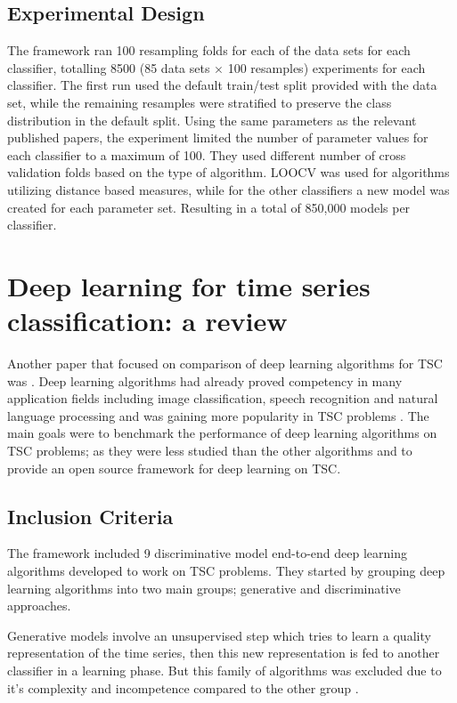 \subsection{Experimental Design}
\label{subsectionUniBakeoffExperiment}
The framework ran 100 resampling folds for each of the data sets for each classifier, totalling 8500 (85 data sets $\times$ 100 resamples) experiments for each classifier.
The first run used the default train/test split provided with the data set, while the remaining resamples were stratified to preserve the class distribution in the default split.
Using the same parameters as the relevant published papers, the experiment limited the number of parameter values for each classifier to a maximum of 100.
They used different number of cross validation folds based on the type of algorithm. LOOCV was used for algorithms utilizing distance based measures,
while for the other classifiers a new model was created for each parameter set. Resulting in a total of 850,000 models per classifier.

\section{Deep learning for time series classification: a review}
\label{DeepLearningReview}
Another paper that focused on comparison of deep learning algorithms for TSC was \cite{fawaz2019deepreview}.
Deep learning algorithms had already proved competency in many application fields including image classification, speech recognition and natural language processing \cite{he2016deep,santos2016literature,krizhevsky2012imagenet,guan2019towards}
and was gaining more popularity in TSC problems \cite{zheng2014time,zheng2016exploiting,zhao2017convolutional}.
The main goals were to benchmark the performance of deep learning algorithms on TSC problems; as they were less studied than the other algorithms and to provide an open source framework for deep learning on TSC.

\subsection{Inclusion Criteria}
\label{subsectionDeepLearningReviewInclusion}
The framework included 9 discriminative model end-to-end deep learning algorithms developed to work on TSC problems.
They started by grouping deep learning algorithms into two main groups; generative and discriminative approaches.

Generative models involve an unsupervised step which tries to learn a quality representation of the time series, then this new representation is fed to another classifier in a learning phase.
But this family of algorithms was excluded due to it's complexity and incompetence compared to the other group \cite{le2017time,bagnall2017great}.

